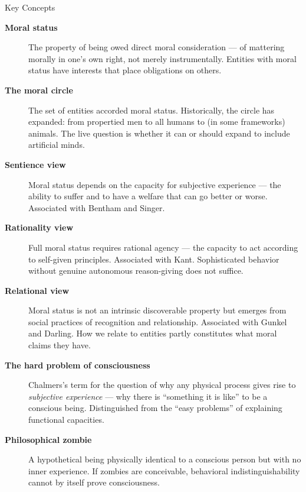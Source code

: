 \documentclass[aspectratio=169,11pt]{beamer}
\begin{document}
\begin{frame}[allowframebreaks]{Key Concepts}
\footnotesize
\begin{description}
    \item[\textbf{Moral status}] The property of being owed direct moral consideration --- of mattering morally in one's own right, not merely instrumentally. Entities with moral status have interests that place obligations on others.

    \item[\textbf{The moral circle}] The set of entities accorded moral status. Historically, the circle has expanded: from propertied men to all humans to (in some frameworks) animals. The live question is whether it can or should expand to include artificial minds.

    \item[\textbf{Sentience view}] Moral status depends on the capacity for subjective experience --- the ability to suffer and to have a welfare that can go better or worse. Associated with Bentham and Singer.

    \item[\textbf{Rationality view}] Full moral status requires rational agency --- the capacity to act according to self-given principles. Associated with Kant. Sophisticated behavior without genuine autonomous reason-giving does not suffice.

    \item[\textbf{Relational view}] Moral status is not an intrinsic discoverable property but emerges from social practices of recognition and relationship. Associated with Gunkel and Darling. How we relate to entities partly constitutes what moral claims they have.

    \item[\textbf{The hard problem of consciousness}] Chalmers's term for the question of why any physical process gives rise to \emph{subjective experience} --- why there is ``something it is like'' to be a conscious being. Distinguished from the ``easy problems'' of explaining functional capacities.

    \item[\textbf{Philosophical zombie}] A hypothetical being physically identical to a conscious person but with no inner experience. If zombies are conceivable, behavioral indistinguishability cannot by itself prove consciousness.


\end{description}
\end{frame}
\end{document}
